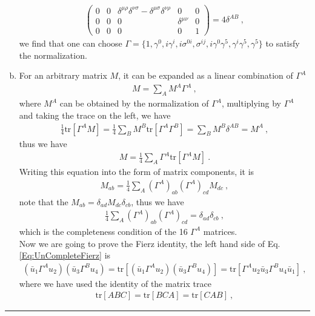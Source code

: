 \documentclass[12pt]{report}
\numberwithin{problemname}{chapter}
\newenvironment{solution}{\vspace{1em}\par\noindent{\large\textbf{\textsc{Solution}}}\par}{\vspace{1em}\hrule}
\begin{document}
\begin{solution}
\begin{enumerate}[(a)]
\begin{align}
\begin{pmatrix}
          0 & 0 & \delta^{\mu\rho}\delta^{\nu\sigma}-\delta^{\mu\sigma}\delta^{\nu\rho} & 0 & 0 \\
          0 & 0 & 0 & \delta^{\mu\nu} & 0 \\
          0 & 0 & 0 & 0 & 1
        \end{pmatrix}=4\delta^{AB}\ ,
    \end{align}
    we find that one can choose $\Gamma=\{1,\gamma^0,i\gamma^i,i\sigma^{0i},\sigma^{ij},i\gamma^0\gamma^5,\gamma^i\gamma^5,\gamma^5\}$ to satisfy the normalization.
    \item For an arbitrary matrix $M$, it can be expanded as a linear combination of $\Gamma^A$
    \begin{align}
        M=\sum_{A}M^{A}\Gamma^{A} \ ,
    \end{align}
    where $M^{A}$ can be obtained by the normalization of $\Gamma^A$, multiplying by $\Gamma^{A}$ and taking the trace on the left, we have
    \begin{align}
        \frac{1}{4}\text{tr}[\Gamma^A M]=\frac{1}{4}\sum_{B}M^{B}\text{tr}[\Gamma^A\Gamma^{B}]=\sum_{B}M^{B}\delta^{AB}=M^A \ ,
    \end{align}
    thus we have
    \begin{align}
        M=\frac{1}{4}\sum_{A}\Gamma^{A}\text{tr}[\Gamma^{A}M]\ .
    \end{align}
    Writing this equation into the form of matrix components, it is
    \begin{align}
        M_{ab}=\frac{1}{4}\sum_{A}(\Gamma^A)_{ab}(\Gamma^A)_{cd}M_{dc} \ ,
    \end{align}
    note that the $M_{ab}=\delta_{ad}M_{dc}\delta_{cb}$, thus we have
    \begin{align}
        \frac{1}{4}\sum_{A}(\Gamma^A)_{ab}(\Gamma^A)_{cd}=\delta_{ad}\delta_{cb} \ ,
    \end{align}
    which is the completeness condition of the 16 $\Gamma^{A}$ matrices. \\
    Now we are going to prove the Fierz identity, the left hand side of Eq. \eqref{Eq:UnCompleteFierz} is
    \begin{align}
        (\bar{u}_1\Gamma^A u_2)(\bar{u}_3\Gamma^B u_4)=\text{tr}[(\bar{u}_1\Gamma^A u_2)(\bar{u}_3\Gamma^B u_4)]=\text{tr}[\Gamma^Au_2\bar{u}_3\Gamma^Bu_4\bar{u}_1]\ ,
    \end{align}
    where we have used the identity of the matrix trace
    \begin{align}
        \text{tr}[ABC]=\text{tr}[BCA]=\text{tr}[CAB] \ ,

\end{align}
\end{enumerate}
\end{solution}
\end{document}
